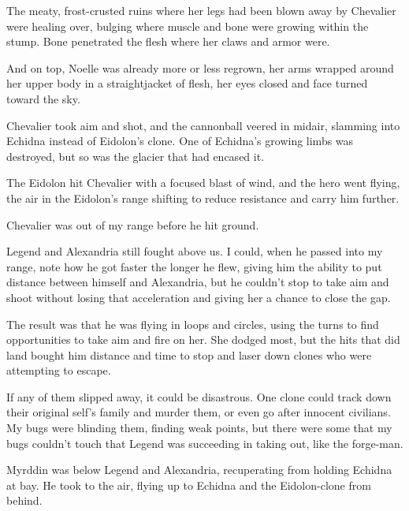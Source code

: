 The meaty, frost-crusted ruins where her legs had been blown away by Chevalier were healing over, bulging where muscle and bone were growing within the stump.  Bone penetrated the flesh where her claws and armor were.



And on top, Noelle was already more or less regrown, her arms wrapped around her upper body in a straightjacket of flesh, her eyes closed and face turned toward the sky.



Chevalier took aim and shot, and the cannonball veered in midair, slamming into Echidna instead of Eidolon's clone.  One of Echidna's growing limbs was destroyed, but so was the glacier that had encased it.



The Eidolon hit Chevalier with a focused blast of wind, and the hero went flying, the air in the Eidolon's range shifting to reduce resistance and carry him further.



Chevalier was out of my range before he hit ground.



Legend and Alexandria still fought above us.  I could, when he passed into my range, note how he got faster the longer he flew, giving him the ability to put distance between himself and Alexandria, but he couldn't stop to take aim and shoot without losing that acceleration and giving her a chance to close the gap.



The result was that he was flying in loops and circles, using the turns to find opportunities to take aim and fire on her.  She dodged most, but the hits that did land bought him distance and time to stop and laser down clones who were attempting to escape.



If any of them slipped away, it could be disastrous.  One clone could track down their original self's family and murder them, or even go after innocent civilians.  My bugs were blinding them, finding weak points, but there were some that my bugs couldn't touch that Legend was succeeding in taking out, like the forge-man.



Myrddin was below Legend and Alexandria, recuperating from holding Echidna at bay.  He took to the air, flying up to Echidna and the Eidolon-clone from behind.



